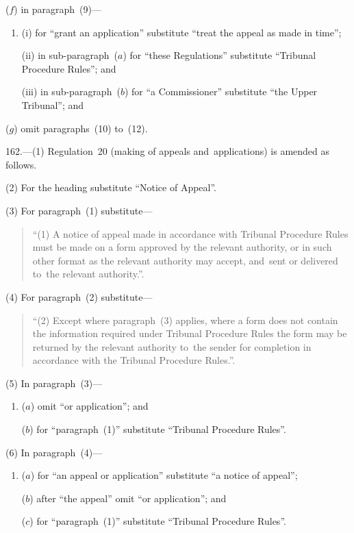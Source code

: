 \documentclass[12pt,a4paper]{article}
\begin{document}
\begin{enumerate}
($f$) in paragraph~(9)—
\begin{enumerate}\item[]
(i) for “grant an application” substitute “treat the appeal as made in time”;

(ii) in sub-paragraph~($a$)  for “these Regulations” substitute “Tribunal Procedure Rules”; and

(iii) in sub-paragraph~($b$)  for “a Commissioner” substitute “the Upper Tribunal”; and
\end{enumerate}

($g$) omit paragraphs~(10) to~(12).
\end{enumerate}

\medskip

162.---(1)  Regulation~20 (making of appeals and~applications) is amended as follows.

(2) For the heading substitute “Notice of Appeal”.

(3) For paragraph~(1) substitute—
\begin{quotation}
“(1) A notice of appeal made in accordance with Tribunal Procedure Rules must be made on a form approved by the relevant authority, or in such other format as the relevant authority may accept, and~sent or delivered to~the relevant authority.”.
\end{quotation}

(4) For paragraph~(2) substitute—
\begin{quotation}
“(2) Except where paragraph~(3) applies, where a form does not contain the information required under Tribunal Procedure Rules the form may be returned by the relevant authority to~the sender for completion in accordance with the Tribunal Procedure Rules.”.
\end{quotation}

(5) In paragraph~(3)—
\begin{enumerate}\item[]
($a$) omit “or application”; and

($b$) for “paragraph~(1)” substitute “Tribunal Procedure Rules”.
\end{enumerate}

(6) In paragraph~(4)—
\begin{enumerate}\item[]
($a$) for “an appeal or application” substitute “a notice of appeal”;

($b$) after “the appeal” omit “or application”; and

($c$) for “paragraph~(1)” substitute “Tribunal Procedure Rules”.
\end{enumerate}
\end{document}
